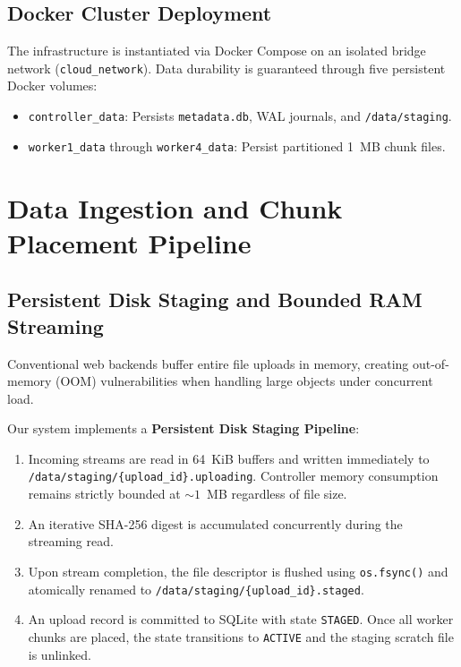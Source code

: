 \documentclass[11pt,a4paper]{article}
\begin{document}
\subsection{Docker Cluster Deployment}
The infrastructure is instantiated via Docker Compose on an isolated bridge network (\texttt{cloud\_network}). Data durability is guaranteed through five persistent Docker volumes:
\begin{itemize}[noitemsep]
    \item \texttt{controller\_data}: Persists \texttt{metadata.db}, WAL journals, and \texttt{/data/staging}.
    \item \texttt{worker1\_data} through \texttt{worker4\_data}: Persist partitioned 1~MB chunk files.
\end{itemize}

\section{Data Ingestion and Chunk Placement Pipeline}
\label{sec:pipeline}

\subsection{Persistent Disk Staging and Bounded RAM Streaming}
Conventional web backends buffer entire file uploads in memory, creating out-of-memory (OOM) vulnerabilities when handling large objects under concurrent load. 

Our system implements a \textbf{Persistent Disk Staging Pipeline}:
\begin{enumerate}[noitemsep]
    \item Incoming streams are read in 64~KiB buffers and written immediately to \texttt{/data/staging/\{upload\_id\}.uploading}. Controller memory consumption remains strictly bounded at $\sim 1$~MB regardless of file size.
    \item An iterative SHA-256 digest is accumulated concurrently during the streaming read.
    \item Upon stream completion, the file descriptor is flushed using \texttt{os.fsync()} and atomically renamed to \texttt{/data/staging/\{upload\_id\}.staged}.
    \item An upload record is committed to SQLite with state \texttt{STAGED}. Once all worker chunks are placed, the state transitions to \texttt{ACTIVE} and the staging scratch file is unlinked.
\end{enumerate}
\end{document}
